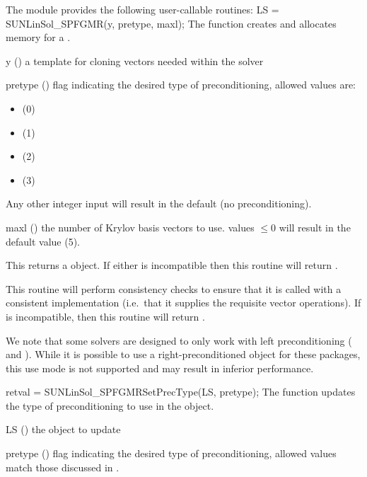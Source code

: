 The module {\sunlinsolspfgmr} provides the following user-callable routines:
{
  LS = SUNLinSol\_SPFGMR(y, pretype, maxl);
}
{
  The function  creates and allocates memory for
  a {\spfgmr} .
}
{
  \begin{args}[pretype]
  \item[y] ()
    a template for cloning vectors needed within the solver
  \item[pretype] ()
    flag indicating the desired type of preconditioning, allowed
    values are:
    \begin{itemize}
    \item {} (0)
    \item {} (1)
    \item {} (2)
    \item {} (3)
    \end{itemize}
    Any other integer input will result in the default (no
    preconditioning).
  \item[maxl] ()
    the number of Krylov basis vectors to use.  values $\le0$ will
    result in the default value (5).
  \end{args}
}
{
  This returns a  object.  If either  is
  incompatible then this routine will return .
}
{
  This routine will perform consistency checks to ensure that it is
  called with a consistent {\nvector} implementation (i.e.~that it
  supplies the requisite vector operations).  If  is
  incompatible, then this routine will return .

  We note that some {\sundials} solvers are designed to only work with
  left preconditioning ({\ida} and {\idas}). While it is possible to
  use a right-preconditioned {\sunlinsolspfgmr} object for these
  packages, this use mode is not supported and may result in inferior
  performance.
}
{
  retval = SUNLinSol\_SPFGMRSetPrecType(LS, pretype);
}
{
  The function  updates the type of
  preconditioning to use in the {\sunlinsolspfgmr} object.
}
{
  \begin{args}[pretype]
  \item[LS] ()
    the {\sunlinsolspfgmr} object to update
  \item[pretype] ()
    flag indicating the desired type of preconditioning, allowed
    values match those discussed in .
  \end{args}
}

